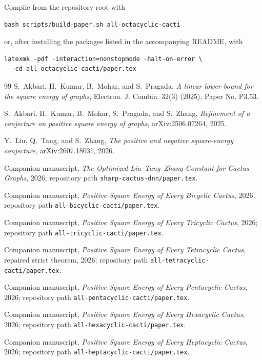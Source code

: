 \documentclass[11pt]{article}
\begin{document}
Compile from the repository root with
\begin{verbatim}
bash scripts/build-paper.sh all-octacyclic-cacti
\end{verbatim}
or, after installing the packages listed in the accompanying README, with
\begin{verbatim}
latexmk -pdf -interaction=nonstopmode -halt-on-error \
  -cd all-octacyclic-cacti/paper.tex
\end{verbatim}

\begin{thebibliography}{99}
S.~Akbari, H.~Kumar, B.~Mohar, and S.~Pragada,
\emph{A linear lower bound for the square energy of graphs},
Electron. J. Combin. 32(3) (2025), Paper No. P3.53.

S.~Akbari, H.~Kumar, B.~Mohar, S.~Pragada, and S.~Zhang,
\emph{Refinement of a conjecture on positive square energy of graphs},
arXiv:2506.07264, 2025.

Y.~Liu, Q.~Tang, and S.~Zhang,
\emph{The positive and negative square-energy conjecture},
arXiv:2607.18031, 2026.

Companion manuscript, \emph{The Optimized Liu--Tang--Zhang Constant for
Cactus Graphs}, 2026; repository path \texttt{sharp-cactus-dnn/paper.tex}.

Companion manuscript, \emph{Positive Square Energy of Every Bicyclic Cactus},
2026; repository path \texttt{all-bicyclic-cacti/paper.tex}.

Companion manuscript, \emph{Positive Square Energy of Every Tricyclic Cactus},
2026; repository path \texttt{all-tricyclic-cacti/paper.tex}.

Companion manuscript, \emph{Positive Square Energy of Every Tetracyclic
Cactus}, repaired strict theorem, 2026; repository path
\texttt{all-tetracyclic-cacti/paper.tex}.

Companion manuscript, \emph{Positive Square Energy of Every Pentacyclic
Cactus}, 2026; repository path \texttt{all-pentacyclic-cacti/paper.tex}.

Companion manuscript, \emph{Positive Square Energy of Every Hexacyclic
Cactus}, 2026; repository path \texttt{all-hexacyclic-cacti/paper.tex}.

Companion manuscript, \emph{Positive Square Energy of Every Heptacyclic
Cactus}, 2026; repository path \texttt{all-heptacyclic-cacti/paper.tex}.


\end{thebibliography}
\end{document}

